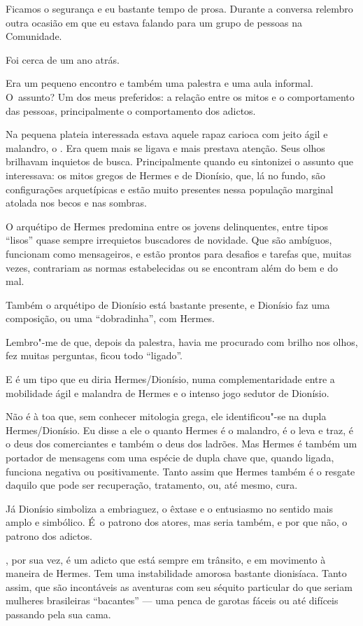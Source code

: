 Ficamos o segurança e eu bastante tempo de prosa. Durante a conversa
relembro outra ocasião em que eu estava falando para um grupo de pessoas
na Comunidade.

Foi cerca de um ano atrás.

Era um pequeno encontro e também uma palestra e uma aula informal. O~assunto? Um dos meus preferidos: a relação entre os mitos e o
comportamento das pessoas, principalmente o comportamento dos adictos.

Na pequena plateia interessada estava aquele rapaz carioca com jeito
ágil e malandro, o . Era quem mais se ligava e mais prestava atenção.
Seus olhos brilhavam inquietos de busca. Principalmente quando eu
sintonizei o assunto que interessava: os mitos gregos de Hermes e de
Dionísio, que, lá no fundo, são configurações arquetípicas e estão muito
presentes nessa população marginal atolada nos becos e nas sombras.

O arquétipo de Hermes predomina entre os jovens delinquentes, entre
tipos ``lisos'' quase sempre irrequietos buscadores de novidade. Que são
ambíguos, funcionam como mensageiros, e estão prontos para desafios e
tarefas que, muitas vezes, contrariam as normas estabelecidas ou se
encontram além do bem e do mal.

Também o arquétipo de Dionísio está bastante presente, e Dionísio faz
uma composição, ou uma ``dobradinha'', com Hermes.

Lembro"-me de que, depois da palestra,  havia me procurado com brilho
nos olhos, fez muitas perguntas, ficou todo ``ligado''.

E  é um tipo que eu diria Hermes/Dionísio, numa complementaridade
entre a mobilidade ágil e malandra de Hermes e o intenso jogo sedutor de
Dionísio.

Não é à toa que, sem conhecer mitologia grega, ele identificou"-se na
dupla Hermes/Dionísio. Eu disse a ele o quanto Hermes é o malandro, é o
leva e traz, é o deus dos comerciantes e também o deus dos ladrões. Mas
Hermes é também um portador de mensagens com uma espécie de dupla chave
que, quando ligada, funciona negativa ou positivamente. Tanto assim que
Hermes também é o resgate daquilo que pode ser recuperação, tratamento,
ou, até mesmo, cura.

Já Dionísio simboliza a embriaguez, o êxtase e o entusiasmo no
sentido mais amplo e simbólico. É~o patrono dos atores, mas seria
também, e por que não, o patrono dos adictos.

, por sua vez, é um adicto que está sempre em trânsito, e em movimento
à maneira de Hermes. Tem uma instabilidade amorosa bastante dionisíaca.
Tanto assim, que são incontáveis as aventuras com seu séquito particular
do que seriam mulheres brasileiras ``bacantes'' --- uma penca de garotas
fáceis ou até difíceis passando pela sua cama.

